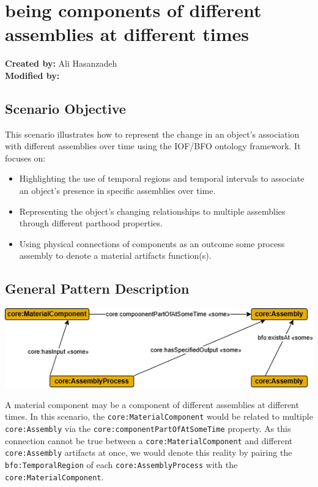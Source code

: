 \section{being components of different assemblies at different times}

\textbf{Created by:} Ali Hasanzadeh \\
\textbf{Modified by:}  \\

\subsection*{Scenario Objective}

This scenario illustrates how to represent the change in an object's association with different assemblies over time using the IOF/BFO ontology framework. It focuses on:
\begin{itemize}
    \item Highlighting the use of temporal regions and temporal intervals to associate an object's presence in specific assemblies over time.
    \item Representing the object's changing relationships to multiple assemblies through different parthood properties.
    \item Using physical connections of components as an outcome some process assembly to denote a material artifacts function(s). 
\end{itemize}

\subsection*{General Pattern Description}

\includegraphics[scale=0.48]{scenarios/assemblies-components/images/assembly-component-general-pattern-description.png}

A material component may be a component of different assemblies at different times. In this scenario, the \texttt{core:MaterialComponent} would be related to multiple \texttt{core:Assembly} via the \texttt{core:componentPartOfAtSomeTime} property. As this connection cannot be true between a \texttt{core:MaterialComponent} and different \texttt{core:Assembly} artifacts at once, we would denote this reality by pairing the \texttt{bfo:TemporalRegion} of each \texttt{core:AssemblyProcess} with the \texttt{core:MaterialComponent}.

